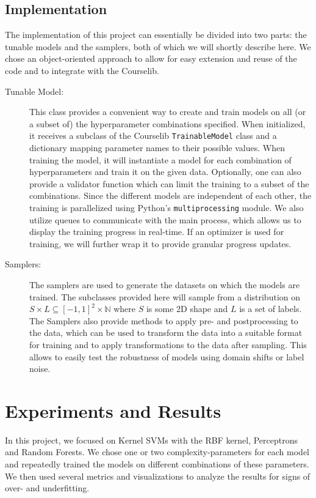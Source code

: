 \documentclass[11pt]{article}
\begin{document}
\subsection{Implementation}
The implementation of this project can essentially be divided into two parts: the tunable models and the samplers, both of which we will shortly describe here. We chose an object-oriented approach
to allow for easy extension and reuse of the code and to integrate with the Courselib.
\begin{description}
    \item[Tunable Model:] This class provides a convenient way to create and train models on all (or a subset of) the hyperparameter combinations specified. When initialized, it receives
        a subclass of the Courselib \texttt{TrainableModel} class and a dictionary mapping parameter names to their possible values. When training the model, it will instantiate a model
        for each combination of hyperparameters and train it on the given data. Optionally, one can also provide a validator function which can limit the training to a subset of the
        combinations. Since the different models are independent of each other, the training is parallelized using Python's \texttt{multiprocessing} module. We also utilize queues to
        communicate with the main process, which allows us to display the training progress in real-time. If an optimizer is used for training, we will further wrap it to provide
        granular progress updates.
    \item[Samplers:] The samplers are used to generate the datasets on which the models are trained. The subclasses provided here will sample from a distribution on $S\times L\subseteq [-1, 1]^2\times \mathbb{N}$
        where $S$ is some 2D shape and $L$ is a set of labels. The Samplers also provide methods to apply pre- and postprocessing to the data, which can be used to transform the data into a suitable format for training
        and to apply transformations to the data after sampling. This allows to easily test the robustness of models using domain shifts or label noise.
\end{description}

\section{Experiments and Results}

In this project, we focused on Kernel SVMs with the RBF kernel, Perceptrons and Random Forests. We chose one or two complexity-parameters for each model and repeatedly trained the models
on different combinations of these parameters. We then used several metrics and visualizations to analyze the results for signs of over- and underfitting.
\end{document}
